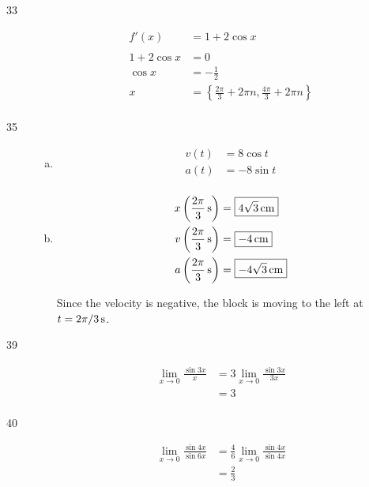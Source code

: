 \documentclass[letterpaper]{exam}
\begin{document}
\begin{description}
    \item[33] 
      \begin{align*}
        f'(x)        & = 1 + 2 \cos x \\
        \\
        1 + 2 \cos x & = 0 \\
        \cos x       & = - \frac{1}{2} \\
        x            & = \boxed{ \left\{ \frac{2 \pi}{3} + 2 \pi n, \frac{4 \pi}{3} + 2 \pi n \right\} } \\
      \end{align*}

    \item[35] 
      \begin{enumerate}[(a)]
        \item 
          \begin{align*}
            v(t)   & = \boxed{ 8 \cos t } \\
            a(t)   & = \boxed{ - 8 \sin t } \\
          \end{align*}

        \item 
          \begin{align*}
            x \left(\unit[\frac{2 \pi}{3}]{s} \right) & = \boxed{ \unit[4 \sqrt{3}]{cm} } \\
            v \left(\unit[\frac{2 \pi}{3}]{s} \right) & = \boxed{ \unit[-4]{cm} } \\
            a \left(\unit[\frac{2 \pi}{3}]{s} \right) & = \boxed{ \unit[- 4 \sqrt{3}]{cm} } \\
          \end{align*}

          Since the velocity is negative, the block is moving to the left at 
          $t = \unit[2 \pi/3]{s}$.

      \end{enumerate}

    \item[39] 
      \begin{align*}
        \lim_{x \to 0} \frac{\sin 3x}{x} & = 3 \lim_{x \to 0} \frac{\sin 3x}{3x} \\
                                         & = \boxed{ 3 } \\
      \end{align*}

    \item[40] 
      \begin{align*}
        \lim_{x \to 0} \frac{\sin 4x}{\sin 6x} & = \frac{4}{6} \lim_{x \to 0} \frac{\sin 4x}{\sin 4x} \\
                                               & = \boxed{ \frac{2}{3} } \\
      \end{align*}


\end{description}
\end{document}
